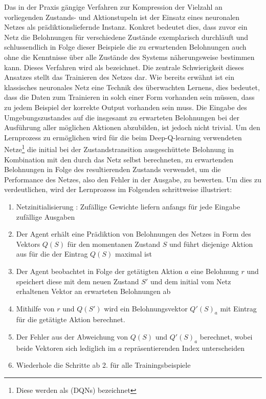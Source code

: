 Das in der Praxis gängige Verfahren zur Kompression der Vielzahl an vorliegenden Zustands- und Aktionstupeln ist der Einsatz eines neuronalen Netzes als prädiktionsliefernde Instanz. Konkret bedeutet dies, dass zuvor ein Netz die Belohnungen für verschiedene Zustände exemplarisch durchläuft und schlussendlich in Folge dieser Beispiele die zu erwartenden Belohnungen auch ohne die Kenntnisse über alle Zustände des Systems näherungsweise bestimmen kann. Dieses Verfahren wird als  bezeichnet. Die zentrale Schwierigkeit dieses Ansatzes stellt das Trainieren des Netzes dar. Wie bereits erwähnt ist ein klassisches neuronales Netz eine Technik des überwachten Lernens, dies bedeutet, dass die Daten zum Trainieren in solch einer Form vorhanden sein müssen, dass zu jedem Beispiel der korrekte Output vorhanden sein muss. Die Eingabe des Umgebungszustandes auf die insgesamt zu erwarteten Belohnungen bei der Ausführung aller möglichen Aktionen abzubilden, ist jedoch nicht trivial. Um den Lernprozess zu ermöglichen wird für die beim Deep-Q-learning verwendeten Netze\footnote{Diese werden als  (DQNs) bezeichnet} die initial bei der Zustandstransition ausgeschüttete Belohnung in Kombination mit den durch das Netz selbst berechneten, zu erwartenden Belohnungen in Folge des resultierenden Zustands verwendet, um die Performance des Netzes, also den Fehler in der Ausgabe, zu bewerten. Um dies zu verdeutlichen, wird der Lernprozess im Folgenden schrittweise illustriert:
\begin{enumerate}
    \item Netzinitialisierung : Zufällige Gewichte liefern anfangs für jede Eingabe zufällige Ausgaben
    \item Der Agent erhält eine Prädiktion von Belohnungen des Netzes in Form des Vektors \(Q(S)\) für den momentanen Zustand \(S\) und führt diejenige Aktion aus für die der Eintrag \(Q(S)\) maximal ist
    \item Der Agent beobachtet in Folge der getätigten Aktion \(a\) eine Belohnung \(r\) und speichert diese mit dem neuen Zustand \(S'\) und dem initial vom Netz erhaltenen Vektor an erwarteten Belohnungen ab
    \item Mithilfe von \(r\) und \(Q(S')\) wird ein Belohnungsvektor \(Q'(S)_a\) mit  Eintrag für die getätigte Aktion berechnet.
    \item Der Fehler aus der Abweichung von \(Q(S)\) und \(Q'(S)_a\) berechnet, wobei beide Vektoren sich lediglich im \(a\) repräsentierenden Index unterscheiden
    \item Wiederhole die Schritte ab 2. für alle Trainingsbeispiele
\end{enumerate}
